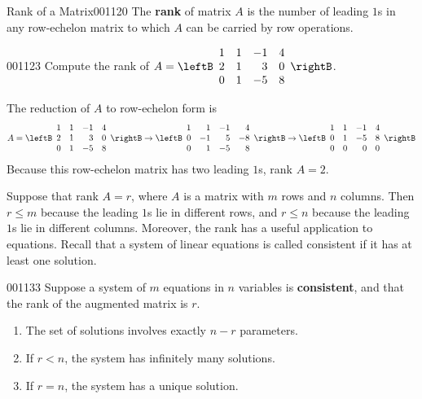 \begin{definition}{Rank of a Matrix}{001120}
The \textbf{rank} of matrix $A$ is the number of leading $1$s in any row-echelon matrix to which $A$ can be carried by row operations.
\end{definition}

\begin{example}{}{001123}
Compute the rank of $A =  
\leftB \begin{array}{rrrr}
	1 & 1 & -1 & 4 \\
	2 & 1 &  3 & 0 \\
	0 & 1 & -5 & 8
\end{array} \rightB$.

\begin{solution}
The reduction of $A$ to row-echelon form is
\begin{equation*}
A =  
\leftB \begin{array}{rrrr}
1 & 1 & -1 & 4 \\
2 & 1 &  3 & 0 \\
0 & 1 & -5 & 8
\end{array} \rightB
\rightarrow
\leftB \begin{array}{rrrr}
1 & 1 & -1 & 4 \\
0 & -1 &  5 & -8 \\
0 &  1 & -5 & 8
\end{array} \rightB
\rightarrow
\leftB \begin{array}{rrrr}
1 & 1 & -1 & 4 \\
0 & 1 &  -5 & 8 \\
0 &  0 & 0 & 0
\end{array} \rightB
\end{equation*}
Because this row-echelon matrix has two leading $1$s, rank $A = 2$.
\end{solution}
\end{example}

Suppose that rank $A = r$, where $A$ is a matrix with $m$ rows and $n$ columns. Then $r \leq m$ because the leading $1$s lie in different rows, and $r \leq  n$ because the leading $1$s lie in different columns. Moreover, the rank has a useful application to equations. Recall that a system of linear equations is called consistent if it has at least one solution.

\begin{theorem}{}{001133}
Suppose a system of $m$ equations in $n$ variables is \textbf{consistent}, and that the rank of the augmented matrix is $r$.

\begin{enumerate}
\item The set of solutions involves exactly $n - r$ parameters.

\item If $r < n$, the system has infinitely many solutions.

\item If $r = n$, the system has a unique solution.

\end{enumerate}
\end{theorem}

